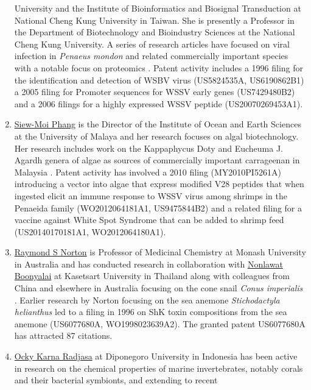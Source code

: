 \documentclass[]{book}
\theoremstyle{definition}
\theoremstyle{definition}
\theoremstyle{definition}
\theoremstyle{remark}
\begin{document}
\begin{enumerate}
  University and the Institute of Bioinformatics and Biosignal
  Transduction at National Cheng Kung University in Taiwan. She is
  presently a Professor in the Department of Biotechnology and
  Bioindustry Sciences at the National Cheng Kung University. A series
  of research articles have focused on viral infection in \emph{Penaeus
  mondon} and related commercially important species with a notable
  focus on proteomics
  \citep{Suraprasit_2014, Rattanarojpong_2007, Gonnet_2008}. Patent
  activity includes a 1996 filing for the identification and detection
  of WSBV virus (US5824535A, US6190862B1) a 2005 filing for Promoter
  sequences for WSSV early genes (US7429480B2) and a 2006 filings for a
  highly expressed WSSV peptide (US20070269453A1).
\item
  \href{https://umexpert.um.edu.my/phang}{Siew-Moi Phang} is the
  Director of the Institute of Ocean and Earth Sciences at the
  University of Malaya and her research focuses on algal biotechnology.
  Her research includes work on the Kappaphycus Doty and Eucheuma J.
  Agardh genera of algae as sources of commercially important
  carrageenan in Malaysia \citep{Tan_2012}. Patent activity has involved
  a 2010 filing (MY2010PI5261A) introducing a vector into algae that
  express modified V28 peptides that when ingested elicit an immune
  response to WSSV virus among shrimps in the Penaeida family
  (WO2012064181A1, US9475844B2) and a related filing for a vaccine
  against White Spot Syndrome that can be added to shrimp feed
  (US20140170181A1, WO2012064180A1).
\item
  \href{https://research.monash.edu/en/persons/raymond-norton}{Raymond S
  Norton} is Professor of Medicinal Chemistry at Monash University in
  Australia and has conducted research in collaboration with
  \href{https://www.researchgate.net/profile/Nonlawat_Boonyalai}{Nonlawat
  Boonyalai} at Kasetsart University in Thailand along with colleagues
  from China and elsewhere in Australia focusing on the cone snail
  \emph{Conus imperialis} \citep{Ye_2012}. Earlier research by Norton
  focusing on the sea anemone \emph{Stichodactyla helianthus} led to a
  filing in 1996 on ShK toxin compositions from the sea anemone
  (US6077680A, WO1998023639A2). The granted patent US6077680A has
  attracted 87 citations.
\item
  \href{https://scholar.google.co.uk/citations?user=oRy3ajUAAAAJ\&hl=en}{Ocky
  Karna Radjasa} at Diponegoro University in Indonesia has been active
  in research on the chemical properties of marine invertebrates,
  notably corals and their bacterial symbionts, and extending to recent

\end{enumerate}
\end{document}
